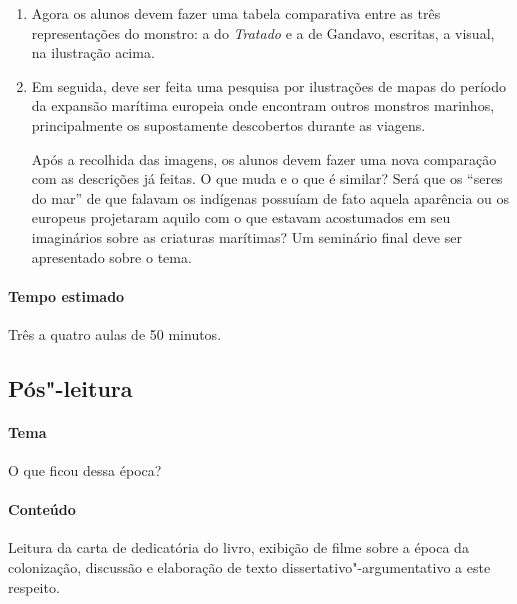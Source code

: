 \documentclass[12pt]{extarticle}
\begin{document}
\begin{enumerate}

\item Agora os alunos devem fazer uma tabela comparativa entre as três 
representações do monstro: a do \emph{Tratado} e a de Gandavo, escritas,
a visual, na ilustração acima. 

\item 
Em seguida, deve ser feita uma pesquisa por ilustrações de mapas do
período da expansão marítima europeia onde encontram outros monstros
marinhos, principalmente os supostamente descobertos durante as viagens.

Após a recolhida das imagens, os alunos devem fazer uma nova comparação 
com as descrições já feitas. O que muda e o que é similar? 
Será que os ``seres do mar'' de que falavam os indígenas possuíam de fato
aquela aparência ou os europeus projetaram aquilo com o que estavam 
acostumados em seu imaginários sobre as criaturas marítimas? 
Um seminário final deve ser apresentado sobre o tema. 

\end{enumerate}

\paragraph{Tempo estimado} Três a quatro aulas de 50 minutos.


\subsection{Pós"-leitura}

\paragraph{Tema} O que ficou dessa época?

\paragraph{Conteúdo} Leitura da carta de dedicatória do livro, exibição de 
filme sobre a época da colonização, discussão e elaboração de texto 
dissertativo"-argumentativo a este respeito.
\end{document}
